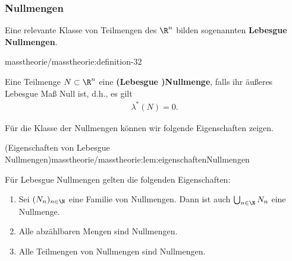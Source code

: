 \documentclass[letterpaper,10pt,german]{jupyterBook}
\begin{document}
\subsubsection{Nullmengen}
\label{\detokenize{masstheorie/masstheorie:nullmengen}}
\par
Eine relevante Klasse von Teilmengen des \(\R^n\) bilden sogenannten \textbf{Lebesgue Nullmengen}.
\begin{definition}{}{masstheorie/masstheorie:definition-32}



\par
Eine Teilmenge \(N \subset \R^n\) eine \textbf{(Lebesgue )Nullmenge}, falls ihr äußeres Lebesgue Maß Null ist, d.h., es gilt
\begin{align*}
\lambda^*(N) = 0.
\end{align*}\end{definition}

\par
Für die Klasse der Nullmengen können wir folgende Eigenschaften zeigen.
\begin{lemma}{(Eigenschaften von Lebesgue Nullmengen)}{masstheorie/masstheorie:lem:eigenschaftenNullmengen}



\par
Für Lebesgue Nullmengen gelten die folgenden Eigenschaften:
\begin{enumerate}

\item {} 
\par
Sei \((N_n)_{n\in\N}\) eine Familie von Nullmengen.
Dann ist auch \(\bigcup_{n\in\N} N_n\) eine Nullmenge.

\item {} 
\par
Alle abzählbaren Mengen sind Nullmengen.

\item {} 
\par
Alle Teilmengen von Nullmengen sind Nullmengen.

\end{enumerate}
\end{lemma}
\end{document}
